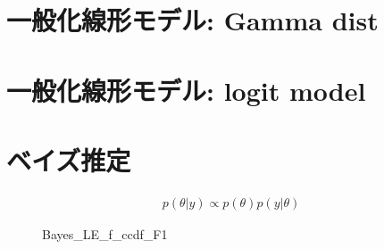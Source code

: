 \documentclass[a4j,11pt,mc, twocolumn]{jreport}
\begin{document}
	\section{一般化線形モデル: Gamma dist}


	\section{一般化線形モデル: logit model}

	\section{ベイズ推定}



\begin{eqnarray}
   p(\theta|y) \propto p(\theta)p(y|\theta)
\end{eqnarray}






	\begin{figure}[h!]
		\begin{center}
				\caption{Bayes\_LE\_f\_ccdf\_F1}
		\end{center}
	\end{figure}
\end{document}

